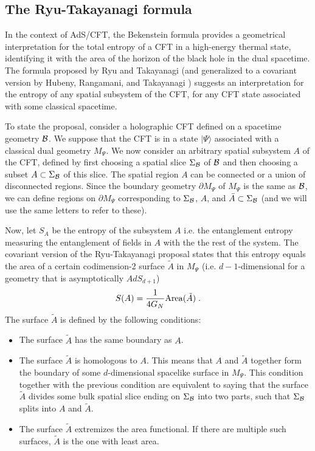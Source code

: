 \documentclass[12pt,epsf]{article}
\newcommand{\be}{\begin{equation}}
\newcommand{\ee}{\end{equation}}
\begin{document}
\subsection{The Ryu-Takayanagi formula}

In the context of AdS/CFT, the Bekenstein formula provides a geometrical interpretation for the total entropy of a CFT in a high-energy thermal state, identifying it with the area of the horizon of the black hole in the dual spacetime.  The formula proposed by Ryu and Takayanagi \cite{ryu2006holographic} (and generalized to a covariant version by Hubeny, Rangamani, and Takayanagi \cite{hubeny2007covariant}) suggests an interpretation for the entropy of any spatial subsystem of the CFT, for any CFT state associated with some classical spacetime.

To state the proposal, consider a holographic CFT defined on a spacetime geometry ${\cal B}$. We suppose that the CFT is in a state $|\Psi \rangle$ associated with a classical dual geometry $M_\Psi$. We now consider an arbitrary spatial subsystem $A$ of the CFT, defined by first choosing a spatial slice $\Sigma_{\cal B}$ of ${\cal B}$ and then choosing a subset $A \subset \Sigma_{\cal B}$ of this slice. The spatial region $A$ can be connected or a union of disconnected regions. Since the boundary geometry $\partial M_\Psi$ of $M_\Psi$ is the same as ${\cal B}$, we can define regions on $\partial M_\Psi$ corresponding to $\Sigma_{\cal B}$, $A$, and $\bar{A} \subset \Sigma_{\cal B}$ (and we will use the same letters to refer to these).

Now, let $S_A$ be the entropy of the subsystem $A$ i.e. the entanglement entropy measuring the entanglement of fields in $A$ with the the rest of the system. The covariant version of the Ryu-Takayanagi proposal states that this entropy equals the area of a certain codimension-2 surface $\tilde{A}$ in $M_\Psi$ (i.e. $d-1$-dimensional for a geometry that is asymptotically $AdS_{d+1}$)
\be
\label{HRT}
S(A) = {1 \over 4 G_N} {\rm Area}(\tilde{A}) \; .
\ee
The surface $\tilde{A}$ is defined by the following conditions:
\begin{itemize}
\item
The surface $\tilde{A}$ has the same boundary as $A$.
\item
The surface $\tilde{A}$ is homologous to $A$. This means that $A$ and $\tilde{A}$ together form the boundary of some $d$-dimensional spacelike surface in $M_\Psi$. This condition together with the previous condition are equivalent to saying that the surface $\tilde{A}$ divides some bulk spatial slice ending on $\Sigma_{\cal B}$ into two parts, such that $\Sigma_{\cal B}$ splits into $A$ and $\tilde{A}$.
\item
The surface $\tilde{A}$ extremizes the area functional. If there are multiple such surfaces, $\tilde{A}$ is the one with least area.
\end{itemize}
\end{document}
